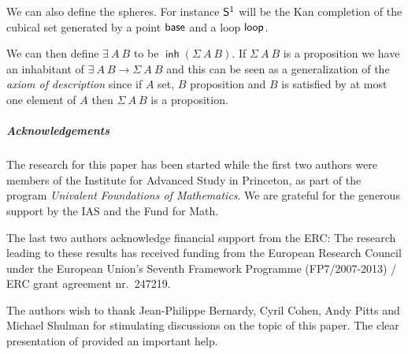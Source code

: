 \documentclass[a4paper,USenglish,draft]{lipics}
\DeclareMathOperator{\inh}{\mathsf{inh}}
\newcommand{\Sph}{{\sf S}^1}
\begin{document}
We can also define the spheres. For instance $\Sph$ will be the Kan
completion of the cubical set generated by a point ${\sf base}$ and a
loop ${\sf loop}$.

We can then define $\exists~A~B$ to be $\inh(\Sigma~A~B)$. If
$\Sigma~A~B$ is a proposition we have an inhabitant of $\exists~A~B\to
\Sigma~ A~B$ and this can be seen as a generalization of the {\em
  axiom of description} since if $A$ set, $B$ proposition and $B$ is
satisfied by at most one element of $A$ then $\Sigma~A~B$ is a
proposition.

\subparagraph*{Acknowledgements}
The research for this paper has been started while the first two
authors were members of the Institute for Advanced Study in Princeton,
as part of the program \emph{Univalent Foundations of Mathematics}.
We are grateful for the generous support by the IAS and the Fund for Math.

The last two authors acknowledge financial support from the ERC: The
research leading to these results has received funding from the
European Research Council under the European Union's Seventh Framework
Programme (FP7/2007-2013) / ERC grant agreement nr.\ 247219.

The authors wish to thank Jean-Philippe Bernardy, Cyril Cohen, Andy
Pitts and Michael Shulman for stimulating discussions on the topic of
this paper. The clear presentation of \cite{Williamson} provided an
important help.
\end{document}
